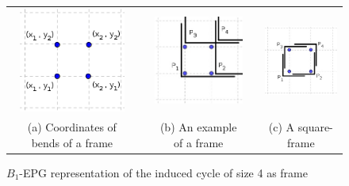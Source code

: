 
\begin{figure}[htb]
  \centering
  \begin{tabular}{c c c c c }
    \includegraphics[width=3.5cm]{./img/dispositionFrameInGrid}    
    & &
   \includegraphics[width=3.5cm]{./img/frame2} 
     & &
   \includegraphics[width=3.5cm]{./img/square2} \\%
   {\footnotesize (a) Coordinates of bends of a frame}  
   & & {\footnotesize (b) An example of a frame} 
   & & {\footnotesize (c) A square-frame} %
  \end{tabular}
  \caption{$B_{1}$-EPG representation of the induced cycle of size 4 as frame}\label{fig:frameInGrid}
\end{figure} 
